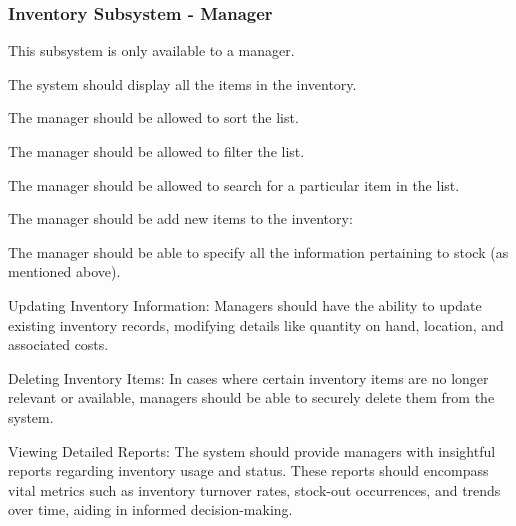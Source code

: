 \documentclass{article}
\begin{document}
	\subsubsection*{Inventory Subsystem - Manager}	
	\begin{list}{R.}{}
		\item This subsystem is only available to a manager. 
		\item The system should display all the items in the inventory.
		\item The manager should be allowed to sort the list.
		\item The manager should be allowed to filter the list.
		\item The manager should be allowed to search for a particular item in the list.
		\item The manager should be add new items to the inventory:
		\begin{list}{R.}{}
			\item The manager should be able to specify all the information pertaining to stock (as mentioned above).
		\end{list}
	    \item Updating Inventory Information: Managers should have the ability to update existing inventory records, modifying details like quantity on hand, location, and associated costs.
	    \item Deleting Inventory Items: In cases where certain inventory items are no longer relevant or available, managers should be able to securely delete them from the system.
	    \item Viewing Detailed Reports: The system should provide managers with insightful reports regarding inventory usage and status. These reports should encompass vital metrics such as inventory turnover rates, stock-out occurrences, and trends over time, aiding in informed decision-making.
	\end{list}
\end{document}
